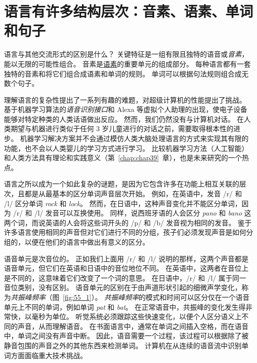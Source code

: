 \section{语言有许多结构层次：音素、语素、单词和句子}

语言与其他交流形式的区别是什么？
关键特征是一组有限且独特的语音或\textit{音素}，能以无限的可能性组合。
音素是\href{https://baike.baidu.com/item/%E8%AF%AD%E7%B4%A0}{语素}的重要单元的组成部分。
每种语言都有一套独特的音素和将它们组合成语素和单词的规则。
单词可以根据句法规则组合成无数个句子。


理解语言的复杂性提出了一系列有趣的难题，对超级计算机的性能提出了挑战。
基于机器学习算法的\textit{语音识别接口}和 Alexa 等虚拟个人助理的出现，使电子设备能够对特定种类的人类话语做出反应。
然而，我们仍然没有与计算机对话。
在人类期望与机器进行类似于任何 3 岁儿童进行的对话之前，需要取得根本性的进步。
机器学习解决方案并不会通过模仿人类大脑处理语言的方式来实现其有限的功能，也不会以人类婴儿的学习方式进行学习。
比较机器学习方法（人工智能）和人类方法具有理论和实践意义（第~\ref{chap:chap39}~章），也是未来研究的一个热点。


语言之所以成为一个如此复杂的谜题，是因为它包含许多在功能上相互关联的层次，且都是从最基本的区分单词声音层次开始。
例如，在英语中，发音 /r/ 和 /l/ 区分单词 \textit{rock} 和 \textit{lock}。
然而，在日语中，这种声音变化并不能区分单词，因为 /r/ 和 /l/ 发音可以互换使用。
同样，说西班牙语的人会区分 \textit{pano} 和 \textit{bano} 这两个词，而说英语的人会将这些词开头的 /p/ 和 /b/ 发音视为相同的发音。
鉴于许多语言使用相同的声音但对它们进行不同的分组，孩子们必须发现声音是如何分组的，以便在他们的语言中做出有意义的区分。


语音单元是次音位的。
正如我们上面用 /r/ 和 /l/ 说明的那样，这两个声音都是语音单元，但它们在英语和日语中的音位地位不同。
在英语中，这两者在音位上是不同的，这意味着它们改变了一个词的意思。
在日语中，/r/ 和 /l/ 属于同一音位类别，没有区别。
语音单元的区别在于由声道形状引起的细微声学变化，称为\textit{共振峰频率}（图~\ref{fig:55_1}）。
\textit{共振峰频率}的模式和时间可以区分仅在一个语音单元上不同的单词，例如单词 \textit{pat} 和 \textit{bat}。
在正常语音中，共振峰的变化发生得非常快，以毫秒为单位。
听觉系统必须跟踪这些快速变化，以便个人区分语义上不同的声音，从而理解语音。
在书面语言中，通常在单词之间插入空格，而在语音中，单词之间没有声音中断。
因此，语音需要一个过程，该过程可以根据除了被静音包围的声音之外的其他东西来检测单词。
计算机在从连续的语音流中识别单词方面面临重大技术挑战。


